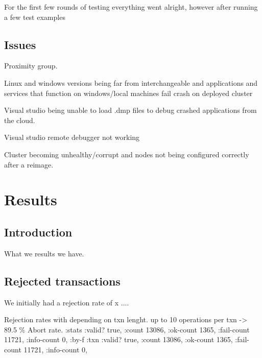 \documentclass[a4paper,10pt,titlepage]{report}
\begin{document}
    For the first few rounds of testing everything went alright, however after running a few test examples

    \subsection{Issues}
    Proximity group.

    Linux and windows versions being far from interchangeable and applications and services that function on windows/local machines fail crash on deployed cluster

    Visual studio being unable to load .dmp files to debug crashed applications from the cloud.

    Visual studio remote debugger not working
    
    Cluster becoming unhealthy/corrupt and nodes not being configured correctly after a reimage.
    
    
%
%

%


    \section{Results}

    \subsection{Introduction}

    What we results we have.

    \subsection{Rejected transactions}
    We initially had a rejection rate of x
    ....
    
    Rejection rates with depending on txn lenght.
    up to 10 operations per txn -> 89.5 \% Abort rate.
    :stats {:valid? true,
         :count 13086,
         :ok-count 1365,
         :fail-count 11721,
         :info-count 0,
         :by-f {:txn {:valid? true,
                      :count 13086,
                      :ok-count 1365,
                      :fail-count 11721,
                      :info-count 0}}},
                      
\end{document}

